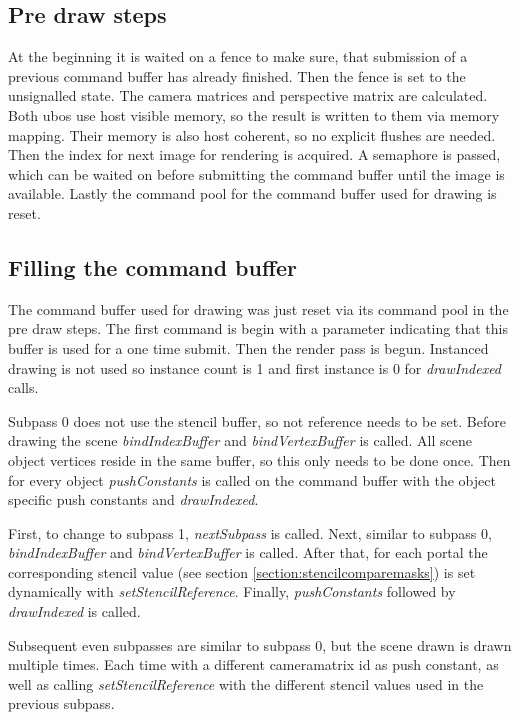 \subsection{Pre draw steps}

At the beginning it is waited on a fence to make sure, that submission of a previous command buffer has already finished. Then the fence is set to the unsignalled state. The camera matrices and perspective matrix are calculated. Both \glspl{ubo} use host visible memory, so the result is written to them via memory mapping. Their memory is also host coherent, so no explicit flushes are needed.
Then the index for next image for rendering is acquired. A semaphore is passed, which can be waited on before submitting the command buffer until the image is available.
Lastly the command pool for the command buffer used for drawing is reset.

\subsection{Filling the command buffer}
The command buffer used for drawing was just reset via its command pool in the pre draw steps. The first command is begin with a parameter indicating that this buffer is used for a one time submit. Then the render pass is begun. Instanced drawing is not used so instance count is 1 and first instance is 0 for \textit{drawIndexed} calls.

Subpass 0 does not use the stencil buffer, so not reference needs to be set. Before drawing the scene \textit{bindIndexBuffer} and \textit{bindVertexBuffer} is called. All scene object vertices reside in the same buffer, so this only needs to be done once. Then for every object \textit{pushConstants} is called on the command buffer with the object specific push constants and \textit{drawIndexed}. 

First, to change to subpass 1, \textit{nextSubpass} is called. Next, similar to subpass 0, \textit{bindIndexBuffer} and \textit{bindVertexBuffer} is called. After that, for each portal the corresponding stencil value (see section \ref{section:stencilcomparemasks}) is set dynamically with \textit{setStencilReference}. Finally, \textit{pushConstants} followed by \textit{drawIndexed} is called.

Subsequent even subpasses are similar to subpass 0, but the scene drawn is drawn multiple times. Each time with a different \gls{cameramatrix} id as push constant, as well as calling \textit{setStencilReference} with the different stencil values used in the previous subpass.

